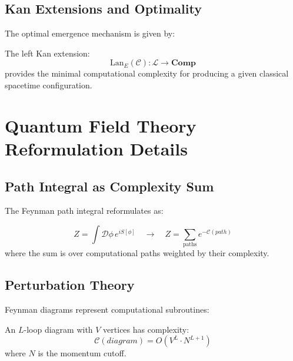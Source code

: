 \documentclass[12pt,a4paper]{article}
\newcommand{\comp}[1]{\mathcal{C}(#1)}
\newcommand{\lorentz}{\mathcal{L}}
\newcommand{\cat}[1]{\mathbf{#1}}
\begin{document}
\subsection{Kan Extensions and Optimality}

The optimal emergence mechanism is given by:

\begin{definition}
The left Kan extension:
\begin{equation}
\text{Lan}_E(\mathcal{C}): \lorentz \to \cat{Comp}
\end{equation}
provides the minimal computational complexity for producing a given classical spacetime configuration.
\end{definition}

\section{Quantum Field Theory Reformulation Details}

\subsection{Path Integral as Complexity Sum}

The Feynman path integral reformulates as:

\begin{theorem}
\begin{equation}
Z = \int \mathcal{D}\phi \, e^{iS[\phi]} \quad \longrightarrow \quad Z = \sum_{\text{paths}} e^{-\comp{path}}
\end{equation}
where the sum is over computational paths weighted by their complexity.
\end{theorem}

\subsection{Perturbation Theory}

Feynman diagrams represent computational subroutines:

\begin{proposition}
An $L$-loop diagram with $V$ vertices has complexity:
\begin{equation}
\comp{diagram} = O(V^L \cdot N^{L+1})
\end{equation}
where $N$ is the momentum cutoff.
\end{proposition}
\end{document}
